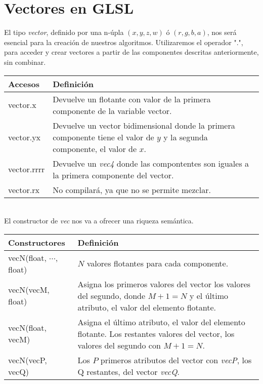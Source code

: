 \section{Vectores en GLSL}
El tipo \textit{vector}, definido por una n-úpla \((x, y, z, w)\) ó \((r, g, b, a)\), nos será esencial para la creación de nuestros algoritmos. Utilizaremos el operador ".", para acceder y crear vectores a partir de las componentes descritas anteriormente, sin combinar.
\begin{table}[h]
    \begin{tabularx}{\textwidth}{l|X}
      \toprule
      Accesos & Definición\\
      \midrule
      vector.x & Devuelve un flotante con valor de la primera componente de la variable vector.\\
      vector.yx & Devuelve un vector bidimensional donde la primera componente tiene el valor de \(y\) y la segunda componente, el valor de \(x\). \\
      vector.rrrr & Devuelve un \textit{vec4} donde las compontentes son iguales a la primera componente del vector. \\
      vector.rx & No compilará, ya que no se permite mezclar. \\
      \bottomrule
    \end{tabularx}
  \end{table}
\\
El constructor de \textit{vec} nos va a ofrecer una riqueza semántica.
\begin{table}[h]
    \begin{tabularx}{\textwidth}{l|X}
      \toprule
      Constructores & Definición\\
      \midrule
      vecN(float, \(\cdots\), float) & \(N\) valores flotantes para cada componente.\\
      vecN(vecM, float) & Asigna los primeros valores del vector los valores del segundo, donde \(M+1=N\) y el último atributo, el valor del elemento flotante. \\
      vecN(float, vecM) & Asigna el último atributo, el valor del elemento flotante. Los restantes valores del vector, los valores del segundo con \(M+1=N\). \\
      vecN(vecP, vecQ) & Los \(P\) primeros atributos del vector con \textit{vecP}, los Q restantes, del vector \textit{vecQ}. \\
      \bottomrule
    \end{tabularx}
\end{table}

